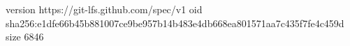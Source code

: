 version https://git-lfs.github.com/spec/v1
oid sha256:e1dfe66b45b881007ce9be957b14b483e4db668ea801571aa7c435f7fe4c459d
size 6846
